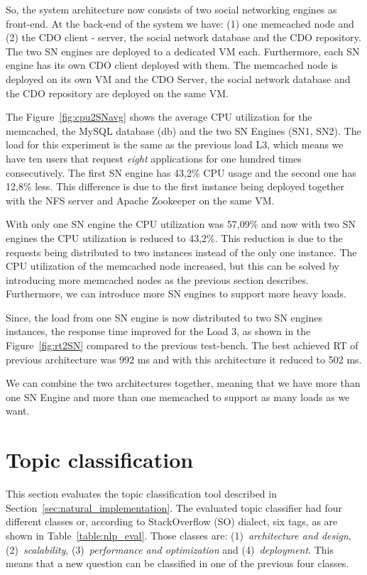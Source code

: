 So, the system architecture now consists of two social networking engines as front-end. At the back-end of the system we have: (1) one memcached node and (2) the CDO client - server, the social network database and the CDO repository. The two SN engines are deployed to a dedicated VM each. Furthermore, each SN engine has its own CDO client deployed with them. The memcached node is deployed on its own VM and the CDO Server, the social network database and the CDO repository are deployed on the same VM.

The Figure~\ref{fig:cpu2SNavg} shows the average CPU utilization for the memcached, the MySQL database (db) and the two SN Engines (SN1, SN2). The load for this experiment is the same as the previous load L3, which means we have ten users that request \emph{eight} applications for one hundred times consecutively. The first SN engine has 43,2\% CPU usage and the second one has 12,8\% less. This difference is due to the first instance being deployed together with the NFS server and Apache Zookeeper on the same VM. 

With only one SN engine the CPU utilization was 57,09\% and now with two SN engines the CPU utilization is reduced to 43,2\%. This reduction is due to the requests being distributed to two instances instead of the only one instance. The CPU utilization of the memcached node increased, but this can be solved by introducing more memcached nodes as the previous section describes. Furthermore, we can introduce more SN engines to support more heavy loads.

Since, the load from one SN engine is now distributed to two SN engines instances, the response time improved for the Load 3, as shown in the Figure~\ref{fig:rt2SN} compared to the previous test-bench. The best achieved RT of previous architecture was 992 ms and with this architecture it reduced to 502 ms.

We can combine the two architectures together, meaning that we have more than one SN Engine and more than one memcached to support as many loads as we want.

\section{Topic classification}
\label{sec:nlp_evaluation}
This section evaluates the topic classification tool described in Section~\ref{sec:natural_implementation}. The evaluated topic classifier had four different classes or, according to StackOverflow (SO) dialect, six tags, as are shown in Table~\ref{table:nlp_eval}. Those classes are: (1)~\emph{architecture and design}, (2)~\emph{scalability}, (3)~\emph{performance and optimization} and (4)~\emph{deployment}. This means that a new question can be classified in one of the previous four classes.

